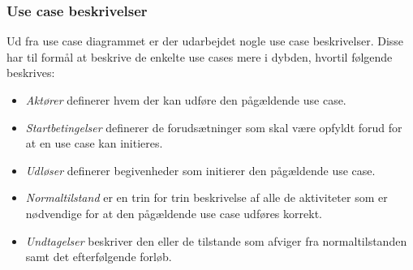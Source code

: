 \subsubsection{Use case beskrivelser}
Ud fra use case diagrammet er der udarbejdet nogle use case beskrivelser. Disse har til formål at beskrive de enkelte use cases mere i dybden, hvortil følgende beskrives:

\begin{itemize}
    \item \textit{Aktører} definerer hvem der kan udføre den pågældende use case.
    \item \textit{Startbetingelser} definerer de forudsætninger som skal være opfyldt forud for at en use case kan initieres.
    \item \textit{Udløser} definerer begivenheder som initierer den pågældende use case.
    \item \textit{Normaltilstand} er en trin for trin beskrivelse af alle de aktiviteter som er nødvendige for at den pågældende use case udføres korrekt.
    \item \textit{Undtagelser} beskriver den eller de tilstande som afviger fra normaltilstanden samt det efterfølgende forløb.
\end{itemize}

